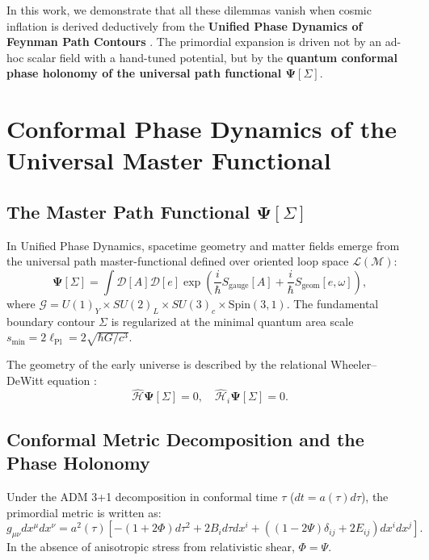 \documentclass[11pt,a4paper]{article}
\begin{document}
In this work, we demonstrate that all these dilemmas vanish when cosmic inflation is derived deductively from the \textbf{Unified Phase Dynamics of Feynman Path Contours} \cite{Pavliuk2024_Monograph}. The primordial expansion is driven not by an ad-hoc scalar field with a hand-tuned potential, but by the \textbf{quantum conformal phase holonomy of the universal path functional $\mathbf{\Psi}[\Sigma]$}.

\section{Conformal Phase Dynamics of the Universal Master Functional}

\subsection{The Master Path Functional $\mathbf{\Psi}[\Sigma]$}
In Unified Phase Dynamics, spacetime geometry and matter fields emerge from the universal path master-functional defined over oriented loop space $\mathcal{L}(\mathcal{M})$:
\begin{equation}
\mathbf{\Psi}[\Sigma] = \int \mathcal{D}[A] \mathcal{D}[e] \exp\left( \frac{i}{\hbar} S_{\mathrm{gauge}}[A] + \frac{i}{\hbar} S_{\mathrm{geom}}[e, \omega] \right),
\end{equation}
where $\mathcal{G} = U(1)_Y \times SU(2)_L \times SU(3)_c \times \mathrm{Spin}(3,1)$. The fundamental boundary contour $\Sigma$ is regularized at the minimal quantum area scale $s_{\min} = 2\ell_{\mathrm{Pl}} = 2\sqrt{\hbar G/c^3}$.

The geometry of the early universe is described by the relational Wheeler--DeWitt equation \cite{Pavliuk2024_Monograph, Pavliuk2024_Work13}:
\begin{equation}
\hat{\mathcal{H}} \mathbf{\Psi}[\Sigma] = 0, \quad \hat{\mathcal{H}}_i \mathbf{\Psi}[\Sigma] = 0.
\end{equation}

\subsection{Conformal Metric Decomposition and the Phase Holonomy}
Under the ADM 3+1 decomposition in conformal time $\tau$ ($dt = a(\tau) d\tau$), the primordial metric is written as:
\begin{equation}
g_{\mu\nu} dx^\mu dx^\nu = a^2(\tau) \left[ -(1 + 2\Phi) d\tau^2 + 2 B_i d\tau dx^i + \left( (1 - 2\Psi)\delta_{ij} + 2 E_{ij} \right) dx^i dx^j \right].
\end{equation}
In the absence of anisotropic stress from relativistic shear, $\Phi = \Psi$.
\end{document}
